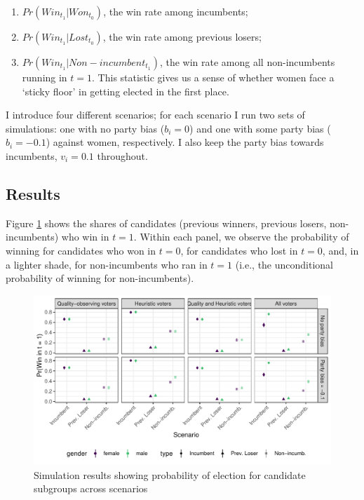 \documentclass[12pt]{article}
\begin{document}
\begin{enumerate}
    \item $Pr(Win_{t_1} | Won_{t_0})$, the win rate among incumbents;
    \item $Pr(Win_{t_1} | Lost_{t_0})$, the win rate among previous losers;
    \item $Pr(Win_{t_1} | Non-incumbent_{t_1})$, the win rate among all non-incumbents running in $t = 1$. This statistic gives us a sense of whether women face a `sticky floor' in getting elected in the first place.
\end{enumerate}

I introduce four different scenarios; for each scenario I run two sets of simulations: one with no party bias ($b_i = 0$) and one with some party bias ($b_i = -0.1$) against women, respectively. I also keep the party bias towards incumbents, $v_i = 0.1$ throughout.

\subsection{Results}

Figure \ref{fig:theory_sim} shows the shares of candidates (previous winners, previous losers, non-incumbents) who win in $t = 1$.
Within each panel, we observe the probability of winning for candidates who won in $t = 0$, for candidates who lost in $t = 0$, and, in a lighter shade, for non-incumbents who ran in $t = 1$ (i.e., the unconditional probability of winning for non-incumbents).

\begin{figure}[htbp]
    \centering
    \includegraphics{../output/figures/theory_sim.pdf}
    \caption{Simulation results showing probability of election for candidate subgroups across scenarios}
    \label{fig:theory_sim}
\end{figure}
\end{document}
